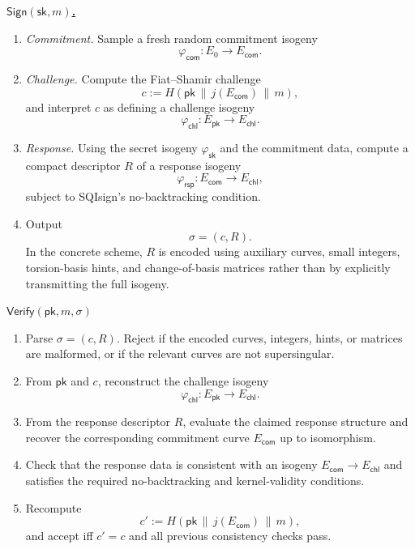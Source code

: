 \begin{algobox}
\underline{\textbf{\(\mathsf{Sign}(\mathsf{sk},m)\).}}
\medskip
\begin{enumerate}
  \setlength{\itemsep}{0.15em}
  \item \emph{Commitment.} Sample a fresh random commitment isogeny
  \[
      \varphi_{\mathsf{com}}:E_0\longrightarrow E_{\mathsf{com}}.
  \]
  \item \emph{Challenge.} Compute the Fiat--Shamir challenge
  \[
      c := H(\mathsf{pk}\,\|\,j(E_{\mathsf{com}})\,\|\,m),
  \]
  and interpret \(c\) as defining a challenge isogeny
  \[
      \varphi_{\mathsf{chl}}:E_{\mathsf{pk}}\longrightarrow E_{\mathsf{chl}}.
  \]
  \item \emph{Response.} Using the secret isogeny
  \(\varphi_{\mathsf{sk}}\) and the commitment data, compute a compact
  descriptor \(R\) of a response isogeny
  \[
      \varphi_{\mathsf{rsp}}:E_{\mathsf{com}}\longrightarrow E_{\mathsf{chl}},
  \]
  subject to SQIsign's no-backtracking condition.
  \item Output
  \[
      \sigma=(c,R).
  \]
  In the concrete scheme, \(R\) is encoded using auxiliary curves, small
  integers, torsion-basis hints, and change-of-basis matrices rather than by
  explicitly transmitting the full isogeny.
\end{enumerate}
\end{algobox}

\begin{algobox}
\underline{\textbf{\(\mathsf{Verify}(\mathsf{pk},m,\sigma)\)}}
\medskip
\begin{enumerate}
  \setlength{\itemsep}{0.15em}
  \item Parse \(\sigma=(c,R)\). Reject if the encoded curves, integers, hints,
  or matrices are malformed, or if the relevant curves are not supersingular.
  \item From \(\mathsf{pk}\) and \(c\), reconstruct the challenge isogeny
  \[
      \varphi_{\mathsf{chl}}:E_{\mathsf{pk}}\longrightarrow E_{\mathsf{chl}}.
  \]
  \item From the response descriptor \(R\), evaluate the claimed response
  structure and recover the corresponding commitment curve
  \(E_{\mathsf{com}}\) up to isomorphism.
  \item Check that the response data is consistent with an isogeny
  \(E_{\mathsf{com}}\to E_{\mathsf{chl}}\) and satisfies the required
  no-backtracking and kernel-validity conditions.
  \item Recompute
  \[
      c' := H(\mathsf{pk}\,\|\,j(E_{\mathsf{com}})\,\|\,m),
  \]
  and accept iff \(c'=c\) and all previous consistency checks pass.
\end{enumerate}
\end{algobox}